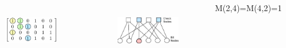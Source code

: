 \documentclass[xcolor=dvipsname]
{beamer}
\begin{document}
\begin{frame}[t]
\begin{columns}
\begin{figure}
\includegraphics[height=2.5cm,width=3cm]{paritymatwtb3}
			\end{figure}	
\begin{figure}
			
\includegraphics[height=2.5cm,width=3.5cm]{tanneri3}
			\end{figure}		
M(2,4)=M(4,2)=1						
\end{columns}
\end{frame}
\end{document}
